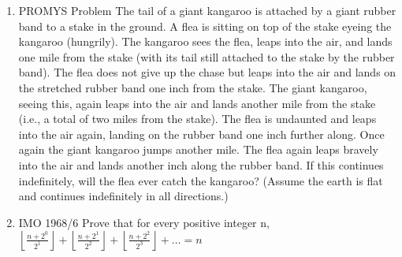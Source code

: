 \documentclass{article}
\begin{document}
\begin{enumerate}
\item PROMYS Problem The tail of a giant kangaroo is attached by a giant rubber band to a stake in the ground. A flea is sitting on top of the stake eyeing the kangaroo (hungrily). The kangaroo sees the flea, leaps into the air, and lands one mile from the stake (with its tail still attached to the stake by the rubber band). The flea does not give up the chase but leaps into the air and lands on the stretched rubber band one inch from the stake. The giant kangaroo, seeing this, again leaps into the air and lands another mile from the stake (i.e., a total of two miles from the stake). The flea is undaunted and leaps into the air again, landing on the rubber band one inch further along. Once again the giant kangaroo jumps another mile. The flea again leaps bravely into the air and lands another inch along the rubber band. If this continues indefinitely, will the flea ever catch the kangaroo? (Assume the earth is flat and continues indefinitely in all directions.)
\item IMO 1968/6 Prove that for every positive integer n, $\left\lfloor \frac{n+2^0}{2^1} \right\rfloor + \left\lfloor \frac{n+2^1}{2^2} \right\rfloor + \left\lfloor \frac{n+2^2}{2^3} \right\rfloor + \ldots = n$
\end{enumerate}
\end{document}
